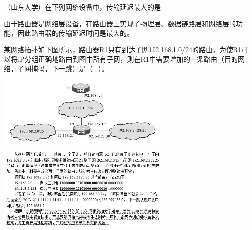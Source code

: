 \question （山东大学）在下列网络设备中，传输延迟最大的是
\par{}
\begin{solution}由于路由器是网络层设备，在路由器上实现了物理层、数据链路层和网络层的功能，因此路由器的传输延迟时间是最大的。
\end{solution}
\question 某网络拓扑如下图所示，路由器R1只有到达子网192.168.1.0/24的路由。为使R1可以将IP分组正确地路由到图中所有子网，则在R1中需要增加的一条路由（目的网络，子网掩码，下一跳）是（
~）。

\includegraphics[width=3.33333in,height=1.33333in]{computerassets/68bb6dada2bc1a91fdc323c08ef13460.jpeg}
\par{}
\begin{solution}\includegraphics[width=3.33333in,height=1.58333in]{computerassets/587e0809d07702794990cae26f6745b2.jpeg}
\end{solution}
